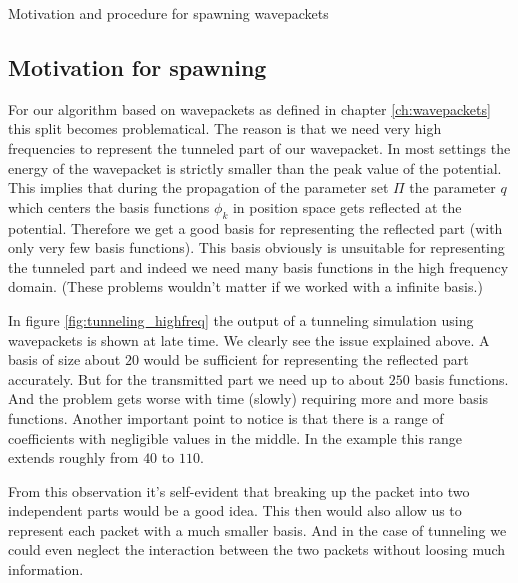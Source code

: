 \begin{chapter}{Motivation and procedure for spawning wavepackets}
\subsection{Motivation for spawning}

For our algorithm based on wavepackets as defined in chapter \ref{ch:wavepackets}
this split becomes problematical. The reason is that we need very high frequencies
to represent the tunneled part of our wavepacket. In most settings the energy of
the wavepacket is strictly smaller than the peak value of the potential. This implies
that during the propagation of the parameter set $\Pi$ the parameter $q$ which
centers the basis functions $\phi_k$ in position space gets reflected at the
potential. Therefore we get a good basis for representing the reflected part (with
only very few basis functions). This basis obviously is unsuitable for representing
the tunneled part and indeed we need many basis functions in the high frequency
domain. (These problems wouldn't matter if we worked with a infinite basis.)

In figure \ref{fig:tunneling_highfreq} the output of a tunneling simulation using
wavepackets is shown at late time. We clearly see the issue explained above. A basis
of size about $20$ would be sufficient for representing the reflected part accurately.
But for the transmitted part we need up to about $250$ basis functions. And the
problem gets worse with time (slowly) requiring more and more basis functions. Another important
point to notice is that there is a range of coefficients with negligible values in
the middle. In the example this range extends roughly from $40$ to $110$.

From this observation it's self-evident that breaking up the packet into two independent
parts would be a good idea. This then would also allow us to represent each packet
with a much smaller basis. And in the case of tunneling we could even neglect the
interaction between the two packets without loosing much information.


\end{chapter}
